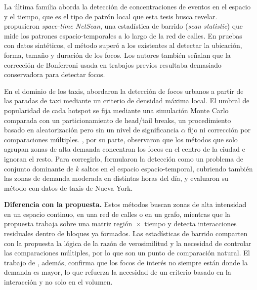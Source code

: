 La última familia aborda la detección de concentraciones de eventos en el
espacio y el tiempo, que es el tipo de patrón local que esta tesis busca
revelar. \cite{Shiode2022} propusieron \emph{space-time NetScan}, una
estadística de barrido (\emph{scan statistic}) que mide los patrones
espacio-temporales a lo largo de la red de calles. En pruebas con datos
sintéticos, el método superó a los existentes al detectar la ubicación,
forma, tamaño y duración de los focos. Los autores también señalan que la
corrección de Bonferroni usada en trabajos previos resultaba demasiado
conservadora para detectar focos.

En el dominio de los taxis, \cite{Chen2021hotspots} abordaron la detección
de focos urbanos a partir de las paradas de taxi mediante un criterio de
densidad máxima local. El umbral de popularidad de cada hotspot se fija
mediante una simulación Monte Carlo comparada con un particionamiento de
head/tail breaks, un procedimiento basado en aleatorización pero sin un
nivel de significancia $\alpha$ fijo ni corrección por comparaciones
múltiples. \cite{Mishra2025}, por su parte, observaron que los métodos que
solo agrupan zonas de alta demanda concentran los focos en el centro de la
ciudad e ignoran el resto. Para corregirlo, formularon la detección como un
problema de conjunto dominante de $k$ saltos en el espacio espacio-temporal,
cubriendo también las zonas de demanda moderada en distintas horas del día,
y evaluaron su método con datos de taxis de Nueva York.

\textbf{Diferencia con la propuesta.} Estos métodos buscan zonas de alta
intensidad en un espacio continuo, en una red de calles o en un grafo,
mientras que la propuesta trabaja sobre una matriz región~$\times$~tiempo y
detecta interacciones residuales dentro de bloques ya formados. Las
estadísticas de barrido comparten con la propuesta la lógica de la razón de
verosimilitud y la necesidad de controlar las comparaciones múltiples, por
lo que son un punto de comparación natural. El trabajo de
\cite{Mishra2025}, además, confirma que los focos de interés no siempre
están donde la demanda es mayor, lo que refuerza la necesidad de un
criterio basado en la interacción y no solo en el volumen.


